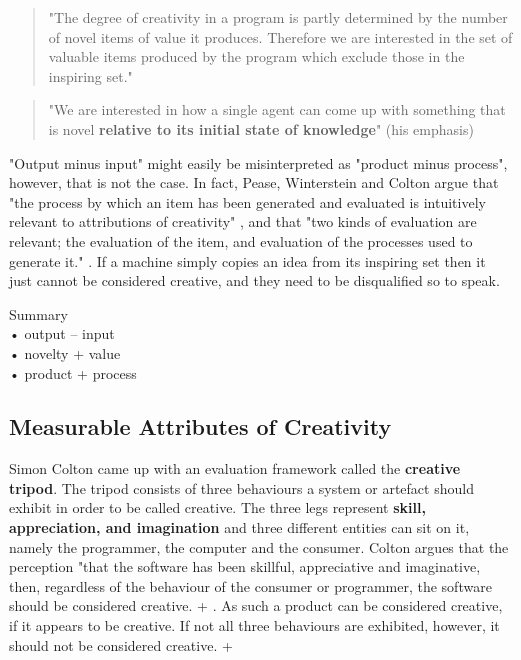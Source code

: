 \begin{quote}
"The degree of creativity in a program is partly determined by the number of novel items of value it produces. Therefore we are interested in the set of valuable items produced by the program which exclude those in the inspiring set." \citep[p.3]{Colton2001}
\end{quote}

\begin{quote}
"We are interested in how a single agent can come up with something that is novel \textbf{relative to its initial state of knowledge}" \citep[p.72]{Ritchie2007}(his emphasis)
\end{quote}

"Output minus input" might easily be misinterpreted as "product minus process", however, that is not the case. In fact, Pease, Winterstein and Colton argue that "the process by which an item has been generated and evaluated is intuitively relevant to attributions of creativity" \citep[p.6]{Pease2001}, and that "two kinds of evaluation are relevant; the evaluation of the item, and evaluation of the processes used to generate it." \citep[p.7]{Pease2001}. If a machine simply copies an idea from its inspiring set then it just cannot be considered creative, and they need to be disqualified so to speak.

\begin{shaded}
Summary\\
•	output – input\\
•	novelty + value\\
•	product + process
\end{shaded}

\subsection{Measurable Attributes of Creativity}

Simon Colton came up with an evaluation framework called the \textbf{creative tripod}. The tripod consists of three behaviours a system or artefact should exhibit in order to be called creative. The three legs represent \textbf{skill, appreciation, and imagination} and three different entities can sit on it, namely the programmer, the computer and the consumer. Colton argues that the perception "that the software has been skillful, appreciative and imaginative, then, regardless of the behaviour of the consumer or programmer, the software should be considered creative. \citep[p.5]{Colton2008a} + \citep[p.5]{Colton2008b}. As such a product can be considered creative, if it appears to be creative. If not all three behaviours are exhibited, however, it should not be considered creative. \citep[p.5]{Colton2008a} + \citep[p.5]{Colton2008b}

